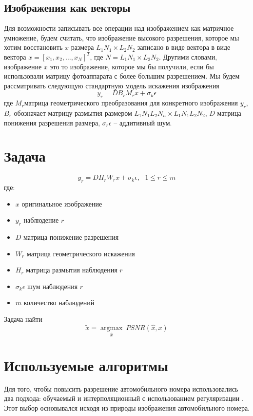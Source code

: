 \subsection{Изображения как векторы}
Для возможности записывать все операции над изображением как матричное умножение, будем считать, что изображение
высокого разрешения, которое мы хотим восстановить $x$ размера $L_{1}N_{1}\times L_{2}N_{2}$ записано в виде вектора в
виде вектора $x=[x_{1},x_{2},\dots,x_{N}]^{T}$, где $N=L_{1}{N_{1}\times L_{2}N_{2}}$. Другими словами, изображение $x$
это то изображение, которое мы бы получили, если бы использовали матрицу фотоаппарата с более большим разрешением. Мы
будем рассматривать следующую стандартную модель искажения изображения
$$ y_{r} = DB_rM_rx+\sigma_{k}\epsilon $$
где $M_{r}$матрица геометрического преобразования для конкретного изображения $y_{r}$, $ B_{r} $ обозначает матрицу размытия
размером $L_{1}N_{1}L_{2}N_{n}\times L_{1}N_{1}L_{2}N_{2}$, $D$ матрица понижения разрешения размера,
$\sigma_{r}\epsilon$ -- аддитивный шум.

\section{Задача}
$$y_r = D H_r W_r x +\sigma_{k}\epsilon,~ ~ ~ 1 \leq r \leq m$$
 где:
 \begin{itemize}
   \item $x$ оригинальное изображение
   \item $y_r$ наблюдение $r$
   \item $D$ матрица понижение разрешения
   \item $W_r$ матрица геометрического искажения
   \item $H_r$ матрица размытия наблюдения $r$
   \item $\sigma_{k}\epsilon$ шум наблюдения $r$
   \item $m$ количество наблюдений
 \end{itemize}
 Задача найти
 $$ \tilde{x} = \underset{\hat{x}}{\operatorname{argmax}}~  PSNR(\hat{x},x)$$

\section{Используемые алгоритмы}
Для того, чтобы повысить разрешение автомобильного номера использовались два подхода: обучаемый \cite{yang2012coupled} и
интерполяционный с использованием регуляризации \cite{suresh2007superresolution}. Этот выбор основывался исходя из
природы изображения автомобильного номера.

